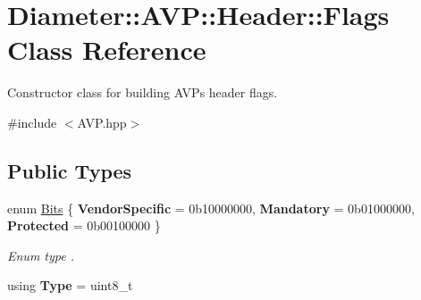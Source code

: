 \hypertarget{classDiameter_1_1AVP_1_1Header_1_1Flags}{}\section{Diameter\+:\+:A\+VP\+:\+:Header\+:\+:Flags Class Reference}
\label{classDiameter_1_1AVP_1_1Header_1_1Flags}


Constructor class for building A\+V\+Ps header flags.  




{\ttfamily \#include $<$A\+V\+P.\+hpp$>$}

\subsection*{Public Types}
\begin{DoxyCompactItemize}
\item 
\mbox{\label{classDiameter_1_1AVP_1_1Header_1_1Flags_af24fa00d6135e01a5b58c9ae84245262}} 
enum \hyperlink{classDiameter_1_1AVP_1_1Header_1_1Flags_af24fa00d6135e01a5b58c9ae84245262}{Bits} \{ {\bfseries Vendor\+Specific} = 0b10000000, 
{\bfseries Mandatory} = 0b01000000, 
{\bfseries Protected} = 0b00100000
 \}\begin{DoxyCompactList}\small\item\em Enum type . \end{DoxyCompactList}
\item 
\mbox{\label{classDiameter_1_1AVP_1_1Header_1_1Flags_ab0ae38018e81989b8614be1a78f5605b}} 
using {\bfseries Type} = uint8\+\_\+t
\end{DoxyCompactItemize}
